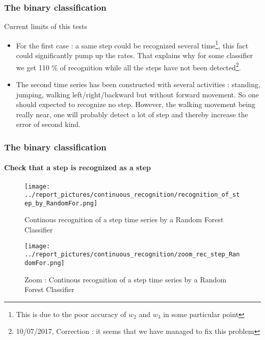 \documentclass[11pt, sans]{beamer}
\begin{document}
\begin{frame}
\frametitle{The binary classification}
\begin{alertblock}{Current limits of this tests}
\begin{itemize}
	\item For the first case : a same step could be recognized several time\footnote{This is due to the poor accuracy of $w_2$ and $w_3$ in some particular point}, this fact could significantly pump up the rates. That explains why for some classifier we get 110 \% of recognition while all the steps have not been detected\footnote{10/07/2017, Correction : it seems that we have managed to fix this problem}.
	\item The second time series has been constructed with several activities : standing, jumping, walking left/right/backward but without forward movement. So one should expected to recognize no step. However, the walking movement being really near, one will probably detect a lot of step and thereby increase the error of second kind.
\end{itemize}
\end{alertblock}

\end{frame}
	
\begin{frame}
\frametitle{The binary classification}
\framesubtitle{Check that a step is recognized as a step}

\begin{overprint}

\begin{figure}[H]
	\texttt{[image: ../report\_pictures/continuous\_recognition/recognition\_of\_step\_by\_RandomFor.png]}
	\caption{Continous recognition of a step time series by a Random Forest Classifier}
	\label{a_step_is_a_step}
\end{figure}

\begin{figure}[H]
	\texttt{[image: ../report\_pictures/continuous\_recognition/zoom\_rec\_step\_RandomFor.png]}
	\caption{Zoom : Continous recognition of a step time series by a Random Forest Classifier}
	\label{a_step_is_a_step_zoom}
\end{figure}

\end{overprint}

\end{frame}
\end{document}
